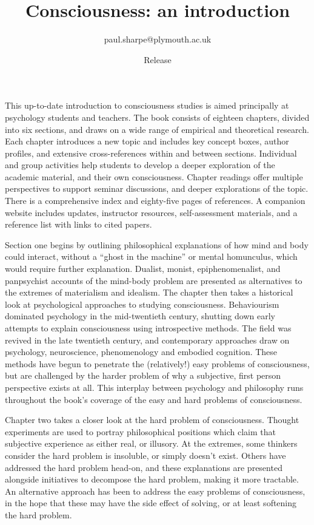 \documentclass[a4paper]{article}
\begin{document}
\title{Consciousness: an introduction}
\date{\gitAuthorDate{} Release\gitRels}
\author{paul.sharpe@plymouth.ac.uk}

\maketitle

This up-to-date introduction to consciousness studies is aimed principally at
psychology students and teachers. The book consists of eighteen chapters,
divided into six sections, and draws on a wide range of empirical and
theoretical research. Each chapter introduces a new topic and includes key
concept boxes, author profiles, and extensive cross-references within and
between sections. Individual and group activities help students to develop a
deeper exploration of the academic material, and their own consciousness.
Chapter readings offer multiple perspectives to support seminar discussions,
and deeper explorations of the topic. There is a comprehensive index and
eighty-five pages of references. A companion website includes updates,
instructor resources, self-assessment materials, and a reference list with
links to cited papers.

Section one begins by outlining philosophical explanations of how mind and
body could interact, without a ``ghost in the machine'' or mental homunculus,
which would require further explanation. Dualist, monist, epiphenomenalist,
and panpsychist accounts of the mind-body problem are presented as
alternatives to the extremes of materialism and idealism. The chapter then
takes a historical look at psychological approaches to studying consciousness.
Behaviourism dominated psychology in the mid-twentieth century, shutting down
early attempts to explain consciousness using introspective methods. The field
was revived in the late twentieth century, and contemporary approaches draw on
psychology, neuroscience, phenomenology and embodied cognition. These methods
have begun to penetrate the (relatively!) easy problems of consciousness, but
are challenged by the harder problem of why a subjective, first person
perspective exists at all. This interplay between psychology and philosophy
runs throughout the book’s coverage of the easy and hard problems of
consciousness.

Chapter two takes a closer look at the hard problem of consciousness. Thought
experiments are used to portray philosophical positions which claim that
subjective experience as either real, or illusory. At the extremes, some
thinkers consider the hard problem is insoluble, or simply doesn’t exist.
Others have addressed the hard problem head-on, and these explanations are
presented alongside initiatives to decompose the hard problem, making it more
tractable. An alternative approach has been to address the easy problems of
consciousness, in the hope that these may have the side effect of solving, or
at least softening the hard problem.
\end{document}
